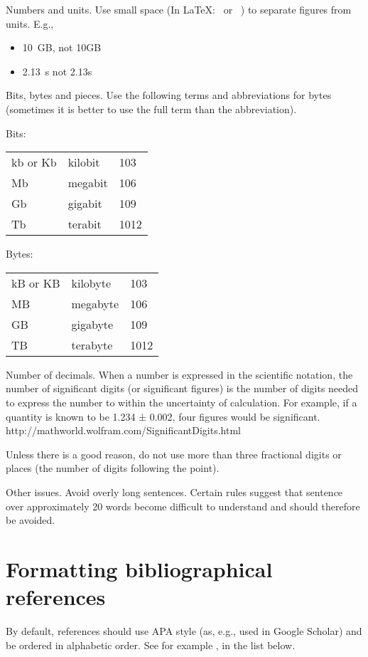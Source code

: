 \documentclass[10pt]{report}
\begin{document}
Numbers and units. Use small space (In \LaTeX: \, or ~) to separate
figures from units. E.g.,

\begin{itemize}
\item 10~GB, not 10GB
\item 2.13~s not 2.13s
\end{itemize}

Bits, bytes and pieces. Use the following terms and abbreviations for
bytes (sometimes it is better to use the full term than the
abbreviation).

Bits:\\
\begin{tabular}{lll}
kb or Kb&	kilobit&	103\\ 
Mb&	megabit&	106\\ 
Gb&	gigabit&	109\\ 
Tb&	terabit&	1012\\ 
\end{tabular}

Bytes:\\
\begin{tabular}{lll}
  kB or KB&	kilobyte&	103\\ 
MB&	megabyte&106\\ 
GB	&gigabyte	&109\\ 
TB	&terabyte	&1012\\ 
\end{tabular}


Number of decimals. When a number is expressed in the scientific notation, the number of significant digits (or significant figures) is the number of digits needed to express the number to within the uncertainty of calculation. For example, if a quantity is known to be 1.234 ± 0.002, four figures would be significant. http://mathworld.wolfram.com/SignificantDigits.html

Unless there is a good reason, do not use more than three fractional digits or places (the number of digits following the point).

Other issues. Avoid overly long sentences. Certain rules suggest that sentence over approximately 20 words become difficult to understand and should therefore be avoided. 


\section{Formatting bibliographical references}

By default, references should use APA style (as, e.g., used in Google
Scholar) and be ordered in alphabetic order. See for example
\cite{bib:tan2004selecting}, in the list below.
\end{document}

